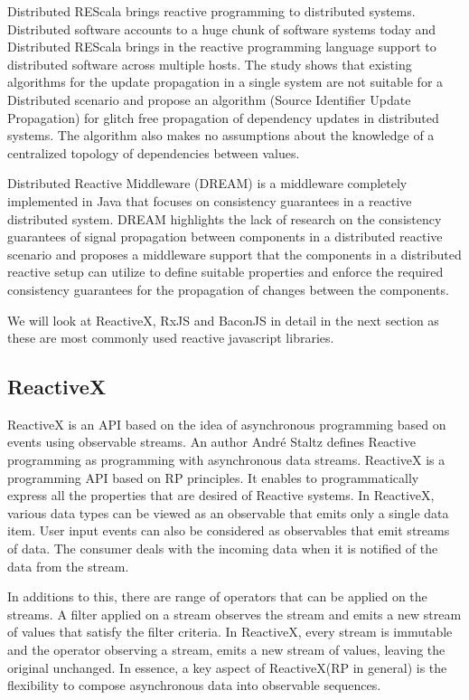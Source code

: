 Distributed REScala\cite{Drechsler:2014:DRU:2660193.2660240} brings reactive programming to distributed systems. Distributed software accounts to a huge chunk of software systems today and Distributed REScala brings in the reactive programming language support to distributed software across multiple hosts. The study\cite{Drechsler:2014:DRU:2660193.2660240} shows that existing algorithms for the update propagation in a single system are not suitable for a Distributed scenario and propose an algorithm (Source Identifier Update Propagation) for glitch free propagation of dependency updates in distributed systems. The algorithm also makes no assumptions about the knowledge of a centralized topology of dependencies between values.

Distributed Reactive Middleware (DREAM) \cite{Margara:2014:WDD:2611286.2611290} is a middleware completely implemented in Java that focuses on consistency guarantees in a reactive distributed system. DREAM highlights the lack of research on the consistency guarantees of signal propagation between components in a distributed reactive scenario and proposes a middleware support that the components in a distributed reactive setup can utilize to define suitable properties and enforce the required consistency guarantees for the propagation of changes between the components.

We will look at ReactiveX, RxJS and BaconJS in detail in the next section as these are most commonly used reactive javascript libraries.

\subsection{ReactiveX}
ReactiveX is an API based on the idea of asynchronous programming based on events using observable streams. An author André Staltz defines Reactive programming as programming with asynchronous data streams\cite{introToRP}. ReactiveX is a programming API based on RP principles. It enables to programmatically express \cite{Doblander:2015:GEA:2675743.2776757} all the properties that are desired of Reactive systems\cite{reactiveManifesto}. In ReactiveX, various data types can be viewed as an observable that emits only a single data item. User input events can also be considered as observables that emit streams of data. The consumer deals with the incoming data when it is notified of the data from the stream.

In additions to this, there are range of operators that can be applied on the streams. A filter applied on a stream observes the stream and emits a new stream of values that satisfy the filter criteria. In ReactiveX, every stream is immutable and the operator observing a stream, emits a new stream of values, leaving the original unchanged. In essence, a key aspect of ReactiveX(RP in general) is the flexibility to compose \cite{Meyerovich:2009:FPL:1639949.1640091} asynchronous data into observable sequences.

